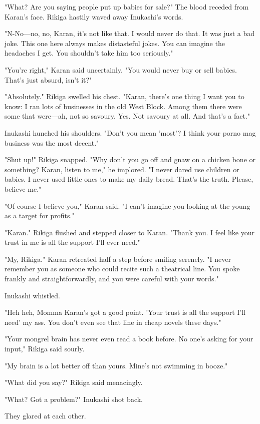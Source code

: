 "What? Are you saying people put up babies for sale?" The blood receded
from Karan's face. Rikiga hastily waved away Inukashi's words.

"N-No---no, no, Karan, it's not like that. I would never do that. It was
just a bad joke. This one here always makes distasteful jokes. You can
imagine the headaches I get. You shouldn't take him too seriously."

"\el You're right," Karan said uncertainly. "You would never buy or sell
babies. That's just absurd, isn't it?"

"Absolutely." Rikiga swelled his chest. "Karan, there's one thing I want
you to know: I ran lots of businesses in the old West Block. Among them
there were some that were---ah, not so savoury. Yes. Not savoury at all.
And that's a fact."

Inukashi hunched his shoulders. "Don't you mean 'most'? I think your
porno mag business was the most decent."

"Shut up!" Rikiga snapped. "Why don't you go off and gnaw on a chicken
bone or something? Karan, listen to me," he implored. "I never dared use
children or babies. I never used little ones to make my daily bread.
That's the truth. Please, believe me."

"Of course I believe you," Karan said. "I can't imagine you looking at
the young as a target for profits."

"Karan." Rikiga flushed and stepped closer to Karan. "Thank you. I feel
like your trust in me is all the support I'll ever need."

"My, Rikiga." Karan retreated half a step before smiling serenely. "I
never remember you as someone who could recite such a theatrical line.
You spoke frankly and straightforwardly, and you were careful with your
words."

Inukashi whistled.

"Heh heh, Momma Karan's got a good point. 'Your trust is all the support
I'll need' my ass. You don't even see that line in cheap novels these
days."

"Your mongrel brain has never even read a book before. No one's asking
for your input," Rikiga said sourly.

"My brain is a lot better off than yours. Mine's not swimming in booze."

"What did you say?" Rikiga said menacingly.

"What? Got a problem?" Inukashi shot back.

They glared at each other.

